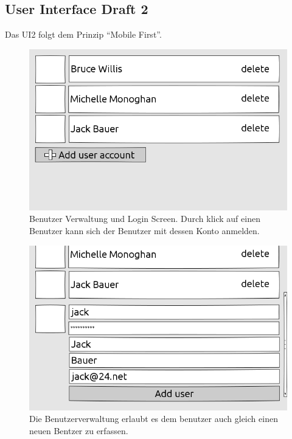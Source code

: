 \begin{landscape}
	
\chapter{User Interface Draft 2}
	Das UI2 folgt dem Prinzip ``Mobile First''.
	\begin{figure}[H]
		\centering
		\includegraphics[height=0.6\textwidth]{../ui/img/uiDraft2/UserView-selectUser.png}
		\caption{Benutzer Verwaltung und Login Screen. Durch klick auf einen Benutzer kann sich der Benutzer mit dessen Konto anmelden.}
		\label{login screen}
	\end{figure}
	\begin{figure}[H]
		\centering
		\includegraphics[height=0.6\textwidth]{../ui/img/uiDraft2/UserView-addUser.png}
		\caption{Die Benutzerverwaltung erlaubt es dem benutzer auch gleich einen neuen Bentzer zu erfassen.}
		\label{user management screen}
	\end{figure}
		\begin{figure}[H]
		\centering

\end{figure}
\end{landscape}

